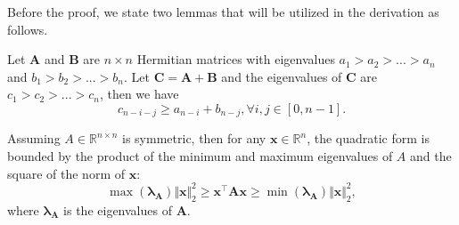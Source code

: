 Before the proof, we state two lemmas that will be utilized in the derivation as follows.

\begin{lemma}
\label{lemma: eigen_rank}
Let $\boldsymbol{A}$ and $\boldsymbol{B}$ are $n \times n$ Hermitian matrices with eigenvalues $a_1 > a_2 > ... > a_n$ and $b_1 > b_2 > ... > b_n$. 
Let $\boldsymbol{C} = \boldsymbol{A} + \boldsymbol{B}$ and the eigenvalues of $\boldsymbol{C}$ are $c_1 > c_2 > ... > c_n$, then we have 
\[
c_{n-i-j} \geq a_{n-i} + b_{n-j}, \forall i,j \in [0, n-1].
\]
\end{lemma}

\begin{lemma}
\label{lemma: eigen_bound}
Assuming $A \in \mathbb{R}^{n \times n}$ is symmetric, then for any $\boldsymbol{x} \in \mathbb{R}^n$, the quadratic form is bounded by the product of the minimum and maximum eigenvalues of $A$ and the square of the norm of $\boldsymbol{x}$:
\[
\max \left( {\boldsymbol{\lambda_{A}}} \right) \Vert \boldsymbol{x} \Vert_2^2
\geq
\boldsymbol{x}^{\top} \boldsymbol{A} \boldsymbol{x} 
\geq
\min \left( {\boldsymbol{\lambda_{A}}} \right) \Vert \boldsymbol{x} \Vert_2^2,
\]
where $\boldsymbol{\lambda_{A}}$ is the eigenvalues of $\boldsymbol{A}$.
\end{lemma}

